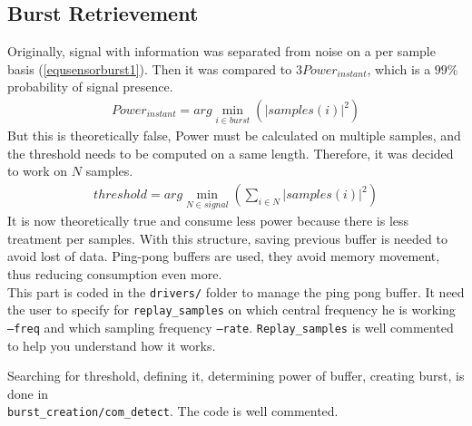 \subsection{Burst Retrievement}
Originally, signal with information was separated from noise on a per sample basis (\ref{equsensorburst1}). Then it was compared to $3Power_{instant}$, which is a $99\%$ probability of signal presence.
\vspace{-7pt}
\begin{align} \label{equsensorburst1}
Power_{instant} = arg\min_{i\in burst}(|samples(i)|^2)
\end{align}
But this is theoretically false, Power must be calculated on multiple samples, and the threshold needs to be computed on a same length. Therefore, it was decided to work on $N$ samples.
\begin{align} \label{equsensorburst2}
threshold = arg\min_{N \in signal}\left(\sum_{i\in N}|samples(i)|^2\right)
\end{align}
It is now theoretically true and consume less power because there is less treatment per samples. With this structure, saving previous buffer is needed to avoid lost of data. Ping-pong buffers are used, they avoid memory movement, thus reducing consumption even more.\\

This part is coded in the \texttt{drivers/} folder to manage the ping pong buffer. It need the user to specify for \texttt{replay\_samples} on which central frequency he is working \texttt{--freq} and which sampling frequency \texttt{--rate}. \texttt{Replay\_samples} is well commented to help you understand how it works.

Searching for threshold, defining it, determining power of buffer, creating burst, is done in \\\texttt{burst\_creation/com\_detect}. The code is well commented.

